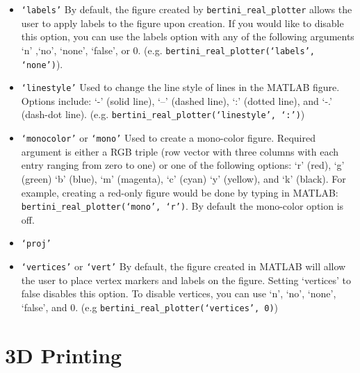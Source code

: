 \documentclass[10pt]{article}
\begin{document}
\begin{itemize}
\item \texttt{`labels'} \newline 
By default, the figure created by \texttt{bertini\_real\_plotter} allows the user to apply labels to the figure upon creation. If you would like to disable this option, you can use the labels option with any of the following arguments `n' ,`no', `none', `false', or 0. \newline (e.g. \texttt{bertini\_real\_plotter(`labels', `none')}).  

\item \texttt{`linestyle'} \newline 
Used to change the line style of lines in the MATLAB figure. Options include: `-' (solid line), `--' (dashed line), `:' (dotted line), and `-.' (dash-dot line). \newline (e.g. \texttt{bertini\_real\_plotter(`linestyle', `:')})

\item \texttt{`monocolor'} or \texttt{`mono'} \newline
Used to create a mono-color figure. Required argument is either a RGB triple (row vector with three columns with each entry ranging from zero to one) or one of the following options: `r' (red), `g' (green) `b' (blue),  `m' (magenta), `c' (cyan) `y' (yellow), and `k' (black). For example, creating a red-only figure would be done by typing in MATLAB: \texttt{bertini\_real\_plotter(`mono', `r')}. By default the mono-color option is off.


\item \texttt{`proj'} 


\item \texttt{`vertices'} or \texttt{`vert'} \newline
By default, the figure created in MATLAB will allow the user to place vertex markers and labels on the figure. Setting `vertices' to false disables this option. To disable vertices, you can use `n', `no', `none', `false', and 0. \newline (e.g \texttt{bertini\_real\_plotter(`vertices', 0)})


\end{itemize}

\section{3D Printing}

\clearpage

\appendix
\end{document}
